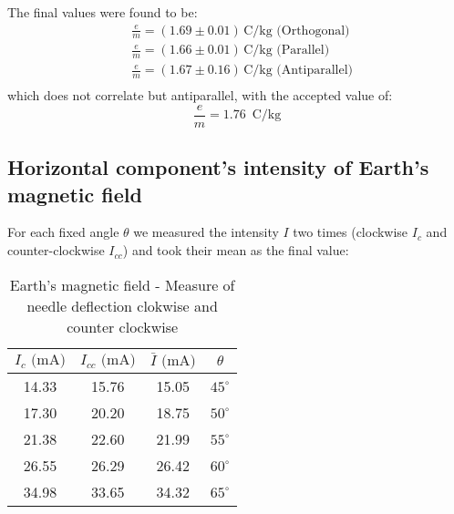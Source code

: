 The final values were found to be:
\begin{align*}
    &\frac{e}{m}=(1.69\pm0.01)\, \mathrm{C/kg}\,\, \text{(Orthogonal)}\\
    &\frac{e}{m}=(1.66\pm0.01)\, \mathrm{C/kg}\,\, \text{(Parallel)}\\
    &\frac{e}{m}=(1.67\pm0.16)\, \mathrm{C/kg}\,\, \text{(Antiparallel)}\\
\end{align*}
which does not correlate but antiparallel, with the accepted value of:
\begin{equation*}
    \frac{e}{m}=1.76\,\,\, \mathrm{C/kg}
\end{equation*}



\subsection{Horizontal component's intensity of Earth's magnetic field}
For each fixed angle $\theta$ we measured the intensity $I$ two times (clockwise $I_c$ and counter-clockwise $I_{cc}$) and took their mean as the final value:
\begin{table}[!htbp]
    {\par\centering
    \begin{tabular}{cccc}
        \hline
        $I_c \text{ (mA)}$ & $I_{cc} \text{ (mA)}$ &  $\bar{I} \text{ (mA)}$ & $\theta$ \\
        \hline
        14.33 & 15.76 & 15.05 & $45^{\circ}$  \\
        17.30 & 20.20 & 18.75 & $50^{\circ}$  \\
        21.38 & 22.60 & 21.99 & $55^{\circ}$  \\
        26.55 & 26.29 & 26.42 & $60^{\circ}$  \\
        34.98 & 33.65 & 34.32 & $65^{\circ}$  \\
        \hline
    \end{tabular}
    \par}
    \caption{Earth's magnetic field - Measure of needle deflection clokwise and counter clockwise}
\end{table}

